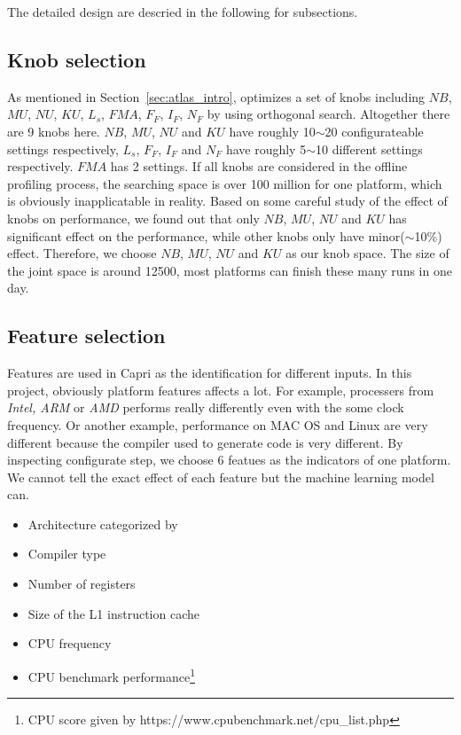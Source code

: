 The detailed design are descried in the following for subsections.

  \subsection{Knob selection}
  \label{sec:knobs}
  As mentioned in Section~\ref{sec:atlas_intro}, \atl optimizes a set of knobs
  including {$NB$, $MU$, $NU$, $KU$, $L_s$, $FMA$, $F_F$, $I_F$, $N_F$} by
  using orthogonal search. Altogether there are 9 knobs here. $NB$, $MU$, $NU$
  and $KU$ have roughly 10$\sim$20 configurateable settings respectively, $L_s$,
  $F_F$, $I_F$ and $N_F$ have roughly 5$\sim$10 different settings respectively.
  $FMA$ has 2 settings. If all knobs are considered in the offline profiling
  process, the searching space is over 100 million for one platform, which is
  obviously inapplicatable in reality. Based on some careful study of the
  effect of knobs on \gem performance, we found out that only $NB$, $MU$, $NU$
  and $KU$ has significant effect on the performance, while other knobs only
  have minor($\sim$10\%) effect. Therefore, we choose $NB$, $MU$, $NU$ and $KU$
  as our knob space. The size of the joint space is around 12500, most
  platforms can finish these many runs in one day.

  \subsection{Feature selection}
  \label{sec:features}
  Features are used in Capri as the identification for different inputs. In this
  project, obviously platform features affects a lot. For example, processers
  from \emph{Intel, ARM} or \emph{AMD} performs really differently even with
  the some clock frequency. Or another example, performance on MAC OS and Linux
  are very different because the compiler used to generate code is very
  different. By inspecting \atl configurate step, we choose 6 featues as the
  indicators of one platform. We cannot tell the exact effect of each feature
  but the machine learning model can.
  \begin{itemize}
  \item Architecture categorized by \atl
  \item Compiler type
  \item Number of registers
  \item Size of the L1 instruction cache
  \item CPU frequency
  \item CPU benchmark performance\footnote{CPU score given by
  https://www.cpubenchmark.net/cpu\_list.php}
  \end{itemize}

